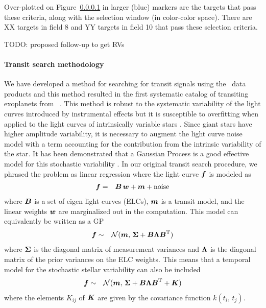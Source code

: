 \documentclass[letterpaper,12pt,preprint]{hack_aastex}
\begin{document}
Over-plotted on Figure~\ref{} in larger (blue) markers are the targets that pass these criteria, along with the selection window (in color-color space). There are XX targets in field 8 and YY targets in field 10 that pass these selection criteria.

TODO: proposed follow-up to get RVs


\paragraph{Transit search methodology}

We have developed a method for searching for transit signals using the \KT\
data products and this method resulted in the first systematic catalog of
transiting exoplanets from \KT\ \citep{Foreman-Mackey:2015}.
This method is robust to the systematic variability of the light curves
introduced by instrumental effects but it is susceptible to overfitting when
applied to the light curves of intrinsically variable stars
\citep{Montet:2015}.
Since giant stars have higher amplitude variability, it is necessary to
augment the light curve noise model with a term accounting for the
contribution from the intrinsic variability of the star.
It has been demonstrated that a Gaussian Process
\citep[GP;][]{Rasmussen:2006, Ambikasaran:2014} is a good effective
model for this stochastic variability \citep{Barclay:2015}.
In our original transit search procedure, we phrased the problem as linear
regression \citep{Foreman-Mackey:2015} where the light curve ${{\boldsymbol{f}}}$ is
modeled as
\begin{eqnarray}
{\ensuremath{{\boldsymbol{f}}}} &=& {{\boldsymbol{B}}}\,{{\boldsymbol{w}}} + {{\boldsymbol{m}}} + \mathrm{noise}
\end{eqnarray}
where ${{\boldsymbol{B}}}$ is a set of eigen light curves (ELCs), ${{\boldsymbol{m}}}$ is a
transit model, and the linear weights ${{\boldsymbol{w}}}$ are marginalized out in the
computation.
This model can equivalently be written as a GP \citep{Rasmussen:2006}
\begin{eqnarray}
{\ensuremath{{\boldsymbol{f}}}} &\sim& \mathcal{N} ({{\boldsymbol{m}}},\,
{{\boldsymbol{\Sigma}}} + {{\boldsymbol{B}}}{{\boldsymbol{\Lambda}}}{{\boldsymbol{B}}}^\mathrm{T})
\end{eqnarray}
where ${{\boldsymbol{\Sigma}}}$ is the diagonal matrix of measurement variances and
${{\boldsymbol{\Lambda}}}$ is the diagonal matrix of the prior variances on the ELC
weights.
This means that a temporal model for the stochastic stellar variability can
also be included
\begin{eqnarray}
{\ensuremath{{\boldsymbol{f}}}} &\sim& \mathcal{N} ({{\boldsymbol{m}}},\,
{{\boldsymbol{\Sigma}}} + {{\boldsymbol{B}}}{{\boldsymbol{\Lambda}}}{{\boldsymbol{B}}}^\mathrm{T} + {{\boldsymbol{K}}})
\end{eqnarray}
where the elements $K_{ij}$ of ${{\boldsymbol{K}}}$ are given by the covariance function
$k(t_i,\,t_j)$.
\end{document}
